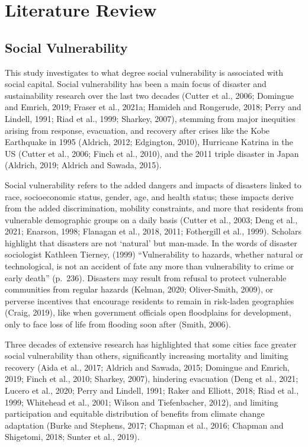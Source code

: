 \documentclass[]{elsarticle} %
\begin{document}
\hypertarget{literature-review}{%
\section{Literature Review}\label{literature-review}}

\hypertarget{social-vulnerability}{%
\subsection{Social Vulnerability}\label{social-vulnerability}}

This study investigates to what degree social vulnerability is
associated with social capital. Social vulnerability has been a main
focus of disaster and sustainability research over the last two decades
(Cutter et al., 2006; Domingue and Emrich, 2019; Fraser et al., 2021a;
Hamideh and Rongerude, 2018; Perry and Lindell, 1991; Riad et al., 1999;
Sharkey, 2007), stemming from major inequities arising from response,
evacuation, and recovery after crises like the Kobe Earthquake in 1995
(Aldrich, 2012; Edgington, 2010), Hurricane Katrina in the US (Cutter et
al., 2006; Finch et al., 2010), and the 2011 triple disaster in Japan
(Aldrich, 2019; Aldrich and Sawada, 2015).

Social vulnerability refers to the added dangers and impacts of
disasters linked to race, socioeconomic status, gender, age, and health
status; these impacts derive from the added discrimination, mobility
constraints, and more that residents from vulnerable demographic groups
on a daily basis (Cutter et al., 2003; Deng et al., 2021; Enarson, 1998;
Flanagan et al., 2018, 2011; Fothergill et al., 1999). Scholars
highlight that disasters are not `natural' but man-made. In the words of
disaster sociologist Kathleen Tierney, (1999) ``Vulnerability to
hazards, whether natural or technological, is not an accident of fate
any more than vulnerability to crime or early death'' (p.~236).
Disasters may result from refusal to protect vulnerable communities from
regular hazards (Kelman, 2020; Oliver-Smith, 2009), or perverse
incentives that encourage residents to remain in risk-laden geographies
(Craig, 2019), like when government officials open floodplains for
development, only to face loss of life from flooding soon after (Smith,
2006).

Three decades of extensive research has highlighted that some cities
face greater social vulnerability than others, significantly increasing
mortality and limiting recovery (Aida et al., 2017; Aldrich and Sawada,
2015; Domingue and Emrich, 2019; Finch et al., 2010; Sharkey, 2007),
hindering evacuation (Deng et al., 2021; Lucero et al., 2020; Perry and
Lindell, 1991; Raker and Elliott, 2018; Riad et al., 1999; Whitehead et
al., 2001; Wilson and Tiefenbacher, 2012), and limiting participation
and equitable distribution of benefits from climate change adaptation
(Burke and Stephens, 2017; Chapman et al., 2016; Chapman and Shigetomi,
2018; Sunter et al., 2019).
\end{document}
